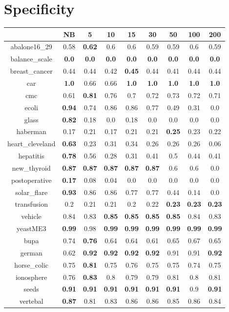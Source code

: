 \documentclass{article}%
\begin{document}
%
\section*{Specificity}%
\begin{tabular}{c|cccccccc}%
\hline%
&NB&5&10&15&30&50&100&200\\%
\hline%
abalone16\_29&0.58&\textbf{0.62}&0.6&0.6&0.59&0.59&0.6&0.59\\%
\hline%
balance\_scale&\textbf{0.0}&\textbf{0.0}&\textbf{0.0}&\textbf{0.0}&\textbf{0.0}&\textbf{0.0}&\textbf{0.0}&\textbf{0.0}\\%
\hline%
breast\_cancer&0.44&0.44&0.42&\textbf{0.45}&0.44&0.41&0.44&0.44\\%
\hline%
car&\textbf{1.0}&0.66&0.66&\textbf{1.0}&\textbf{1.0}&\textbf{1.0}&\textbf{1.0}&\textbf{1.0}\\%
\hline%
cmc&0.61&\textbf{0.81}&0.76&0.7&0.72&0.73&0.72&0.71\\%
\hline%
ecoli&\textbf{0.94}&0.74&0.86&0.86&0.77&0.49&0.31&0.0\\%
\hline%
glass&\textbf{0.82}&0.18&0.0&0.18&0.0&0.0&0.0&0.0\\%
\hline%
haberman&0.17&0.21&0.17&0.21&0.21&\textbf{0.25}&0.23&0.22\\%
\hline%
heart\_cleveland&\textbf{0.63}&0.23&0.31&0.34&0.26&0.26&0.26&0.06\\%
\hline%
hepatitis&\textbf{0.78}&0.56&0.28&0.31&0.41&0.5&0.44&0.41\\%
\hline%
new\_thyroid&\textbf{0.87}&\textbf{0.87}&\textbf{0.87}&\textbf{0.87}&\textbf{0.87}&0.6&0.6&0.0\\%
\hline%
postoperative&\textbf{0.17}&0.08&0.04&0.0&0.0&0.0&0.0&0.0\\%
\hline%
solar\_flare&\textbf{0.93}&0.86&0.86&0.77&0.77&0.44&0.14&0.0\\%
\hline%
transfusion&0.2&0.21&0.21&0.2&0.22&\textbf{0.23}&\textbf{0.23}&\textbf{0.23}\\%
\hline%
vehicle&0.84&0.83&\textbf{0.85}&\textbf{0.85}&\textbf{0.85}&\textbf{0.85}&0.84&0.83\\%
\hline%
yeastME3&\textbf{0.99}&0.98&\textbf{0.99}&\textbf{0.99}&\textbf{0.99}&\textbf{0.99}&\textbf{0.99}&\textbf{0.99}\\%
\hline%
bupa&0.74&\textbf{0.76}&0.64&0.64&0.61&0.65&0.67&0.65\\%
\hline%
german&0.62&\textbf{0.92}&\textbf{0.92}&\textbf{0.92}&\textbf{0.92}&0.91&0.91&\textbf{0.92}\\%
\hline%
horse\_colic&0.75&\textbf{0.81}&0.75&0.76&0.75&0.75&0.74&0.75\\%
\hline%
ionosphere&0.76&\textbf{0.83}&0.8&0.79&0.79&0.81&0.8&0.81\\%
\hline%
seeds&\textbf{0.91}&\textbf{0.91}&\textbf{0.91}&\textbf{0.91}&\textbf{0.91}&\textbf{0.91}&0.9&\textbf{0.91}\\%
\hline%
vertebal&\textbf{0.87}&0.81&0.83&0.86&0.86&0.85&0.86&0.84\\%
\hline%
\end{tabular}
\end{document}
